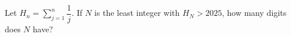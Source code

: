 Let $H_n=\sum_{j=1}^n\dfrac{1}{j}$. If $N$ is the least integer with $H_N>2025$, how many digits does $N$ have?
